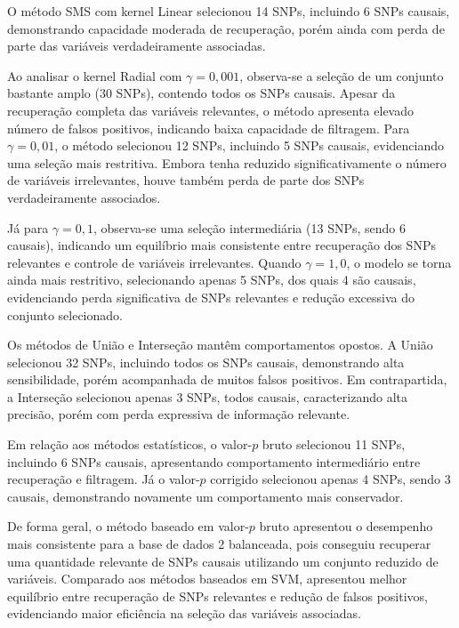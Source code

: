 \documentclass[
    12pt,
    a4paper,
    oneside,
    english,
    french,
    spanish,
    brazil
    ]{abntex2}
\begin{document}
O método SMS com kernel Linear selecionou 14 SNPs, incluindo 6 SNPs causais, demonstrando capacidade moderada de recuperação, porém ainda com perda de parte das variáveis verdadeiramente associadas.

Ao analisar o kernel Radial com $\gamma = 0{,}001$, observa-se a seleção de um conjunto bastante amplo (30 SNPs), contendo todos os SNPs causais. Apesar da recuperação completa das variáveis relevantes, o método apresenta elevado número de falsos positivos, indicando baixa capacidade de filtragem. Para $\gamma = 0{,}01$, o método selecionou 12 SNPs, incluindo 5 SNPs causais, evidenciando uma seleção mais restritiva. Embora tenha reduzido significativamente o número de variáveis irrelevantes, houve também perda de parte dos SNPs verdadeiramente associados.

Já para $\gamma = 0{,}1$, observa-se uma seleção intermediária (13 SNPs, sendo 6 causais), indicando um equilíbrio mais consistente entre recuperação dos SNPs relevantes e controle de variáveis irrelevantes. Quando $\gamma = 1{,}0$, o modelo se torna ainda mais restritivo, selecionando apenas 5 SNPs, dos quais 4 são causais, evidenciando perda significativa de SNPs relevantes e redução excessiva do conjunto selecionado.

Os métodos de União e Interseção mantêm comportamentos opostos. A União selecionou 32 SNPs, incluindo todos os SNPs causais, demonstrando alta sensibilidade, porém acompanhada de muitos falsos positivos. Em contrapartida, a Interseção selecionou apenas 3 SNPs, todos causais, caracterizando alta precisão, porém com perda expressiva de informação relevante.

Em relação aos métodos estatísticos, o valor-$p$ bruto selecionou 11 SNPs, incluindo 6 SNPs causais, apresentando comportamento intermediário entre recuperação e filtragem. Já o valor-$p$ corrigido selecionou apenas 4 SNPs, sendo 3 causais, demonstrando novamente um comportamento mais conservador.

De forma geral, o método baseado em valor-$p$ bruto apresentou o desempenho mais consistente para a base de dados 2 balanceada, pois conseguiu recuperar uma quantidade relevante de SNPs causais utilizando um conjunto reduzido de variáveis. Comparado aos métodos baseados em SVM, apresentou melhor equilíbrio entre recuperação de SNPs relevantes e redução de falsos positivos, evidenciando maior eficiência na seleção das variáveis associadas.
\end{document}

